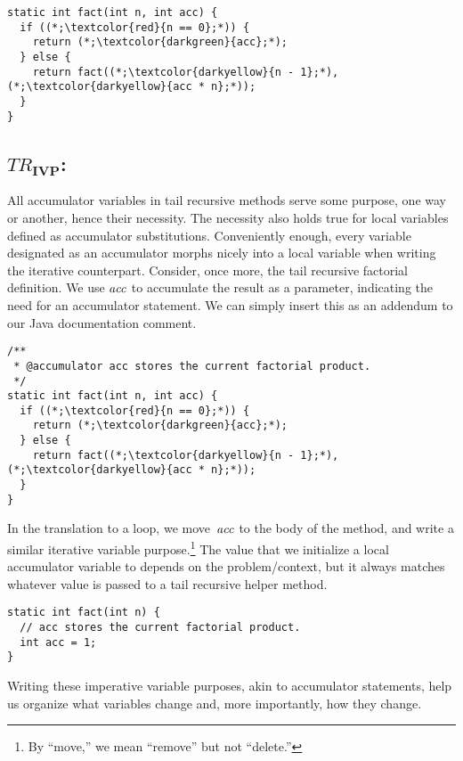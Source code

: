 \begin{lstlisting}[language=MyJava]
static int fact(int n, int acc) {
  if ((*;\textcolor{red}{n == 0};*)) {
    return (*;\textcolor{darkgreen}{acc};*);
  } else {
    return fact((*;\textcolor{darkyellow}{n - 1};*), (*;\textcolor{darkyellow}{acc * n};*));
  }
}
\end{lstlisting}

\subsection{\emph{$TR_\mathbf{IVP}$}:} All accumulator variables in tail recursive methods serve some purpose, one way or another, hence their necessity. 
The necessity also holds true for local variables defined as accumulator substitutions. 
Conveniently enough, every variable designated as an accumulator morphs nicely into a local variable when writing the iterative counterpart. 
Consider, once more, the tail recursive factorial definition. 
We use $\emph{acc}$ to accumulate the result as a parameter, indicating the need for an accumulator statement. 
We can simply insert this as an addendum to our Java documentation comment.

\begin{lstlisting}[language=MyJava]
/**
 * @accumulator acc stores the current factorial product. 
 */
static int fact(int n, int acc) {
  if ((*;\textcolor{red}{n == 0};*)) {
    return (*;\textcolor{darkgreen}{acc};*);
  } else {
    return fact((*;\textcolor{darkyellow}{n - 1};*), (*;\textcolor{darkyellow}{acc * n};*));
  }
}
\end{lstlisting}

In the translation to a loop, we move~$\emph{acc}$ to the body of the method, and write a similar iterative variable purpose.\footnote{By ``move,'' we mean ``remove'' but not ``delete.''} 
The value that we initialize a local accumulator variable to depends on the problem/context, but it always matches whatever value is passed to a tail recursive helper method.

\begin{lstlisting}[language=MyJava]
static int fact(int n) {
  // acc stores the current factorial product. 
  int acc = 1;
}
\end{lstlisting}

Writing these imperative variable purposes, akin to accumulator statements, help us organize what variables change and, more importantly, how they change. 

